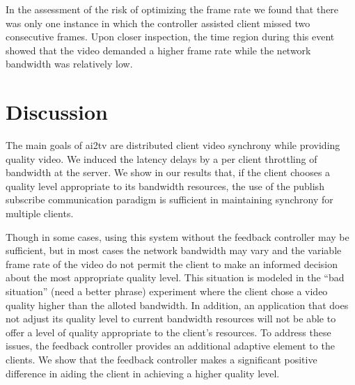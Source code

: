 \documentclass{sig-alternate}
\begin{document}
In the assessment of the risk of optimizing the frame rate we found
that there was only one instance in which the controller assisted
client missed two consecutive frames.  Upon closer inspection, the
time region during this event showed that the video demanded a higher
frame rate while the network bandwidth was relatively low.


\section{Discussion} \label{discussion}

The main goals of ai2tv are distributed client video synchrony while
providing quality video.  We induced the latency delays by a per
client throttling of bandwidth at the server.  We show in our results
that, if the client chooses a quality level appropriate to its
bandwidth resources, the use of the publish subscribe communication
paradigm is sufficient in maintaining synchrony for multiple clients.

Though in some cases, using this system without the feedback
controller may be sufficient, but in most cases the network bandwidth
may vary and the variable frame rate of the video do not permit the
client to make an informed decision about the most appropriate quality
level.  This situation is modeled in the ``bad situation'' (need a
better phrase) experiment where the client chose a video quality
higher than the alloted bandwidth.  In addition, an application that
does not adjust its quality level to current bandwidth resources will
not be able to offer a level of quality appropriate to the client's
resources.  To address these issues, the feedback controller provides
an additional adaptive element to the clients.  We show that the
feedback controller makes a significant positive difference in aiding
the client in achieving a higher quality level.  
\end{document}
